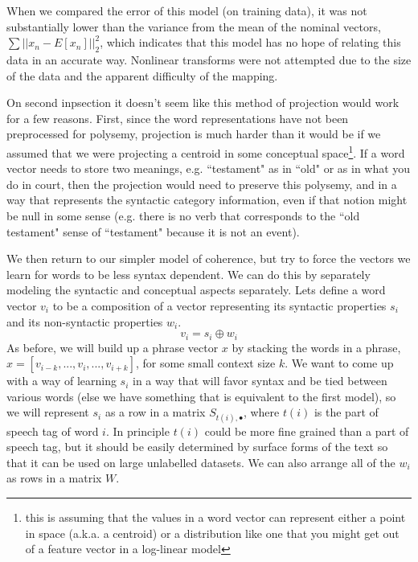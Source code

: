 \documentclass[11pt,letterpaper]{article}
\begin{document}
When we compared the error of this model (on training data), it
was not substantially lower than the variance from the mean of the nominal vectors,
$\sum ||x_n - E[x_n]||_2^2$, which indicates that this model has no hope
of relating this data in an accurate way. Nonlinear transforms were not attempted
due to the size of the data and the apparent difficulty of the mapping.


On second inpsection it doesn't seem like this method of projection would work for a few reasons.
First, since the word representations have not been preprocessed for polysemy, projection is much harder than
it would be if we assumed that we were projecting a centroid in some conceptual space\footnote{this
is assuming that the values in a word vector can represent either a point in space (a.k.a. a centroid)
or a distribution like one that you might get out of a feature vector in a log-linear model}.
If a word vector needs to store two meanings, e.g. ``testament" as in ``old" or as in what you do in court,
then the projection would need to preserve this polysemy, and in a way that represents the
syntactic category information, even if that notion might be null in some sense
(e.g. there is no verb that corresponds to the ``old testament" sense of ``testament" because it is not an event).


We then return to our simpler model of coherence,
but try to force the vectors we learn for words to be less syntax dependent.
We can do this by separately modeling the syntactic and conceptual aspects separately.
Lets define a word vector $v_i$ to be a composition of a vector representing its
syntactic properties $s_i$ and its non-syntactic properties $w_i$.
\[
	v_i = s_i \oplus w_i
\]
As before, we will build up a phrase vector $x$ by stacking the words in a phrase,
$x = [v_{i-k}, ..., v_i, ..., v_{i+k}]$, for some small context size $k$.
We want to come up with a way of learning $s_i$ in a way that will favor syntax and
be tied between various words (else we have something that is equivalent to the first model),
so we will represent $s_i$ as a row in a matrix $S_{t(i),\bullet}$,
where $t(i)$ is the part of speech tag of word $i$. In principle $t(i)$ could be more
fine grained than a part of speech tag, but it should be easily determined by surface
forms of the text so that it can be used on large unlabelled datasets.
We can also arrange all of the $w_i$ as rows in a matrix $W$.
\end{document}
